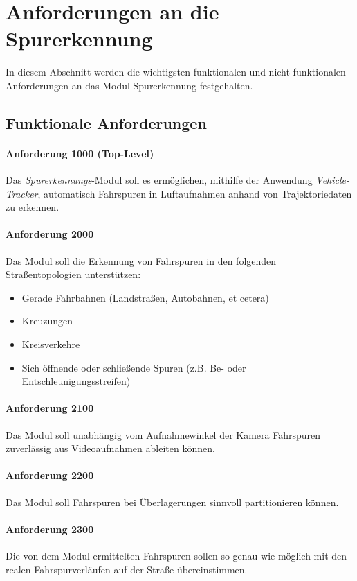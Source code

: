 \section{Anforderungen an die Spurerkennung}
\label{sec:requirements}

In diesem Abschnitt werden die wichtigsten funktionalen und nicht funktionalen Anforderungen
an das Modul Spurerkennung festgehalten.

\subsection{Funktionale Anforderungen}

\paragraph{Anforderung 1000 (Top-Level)}
Das \textit{Spurerkennungs}-Modul soll es ermöglichen, mithilfe der Anwendung \textit{Vehicle-Tracker},
automatisch Fahrspuren in Luftaufnahmen anhand von Trajektoriedaten zu erkennen.

\paragraph{Anforderung 2000}
Das Modul soll die Erkennung von Fahrspuren in den folgenden Straßentopologien unterstützen:

\begin{itemize}
    \item Gerade Fahrbahnen (Landstraßen, Autobahnen, et cetera)
    \item Kreuzungen
    \item Kreisverkehre
    \item Sich öffnende oder schließende Spuren (z.B. Be- oder Entschleunigungsstreifen)
\end{itemize}

\paragraph{Anforderung 2100}
Das Modul soll unabhängig vom Aufnahmewinkel der Kamera Fahrspuren zuverlässig aus Videoaufnahmen ableiten können.

\paragraph{Anforderung 2200}
Das Modul soll Fahrspuren bei Überlagerungen sinnvoll partitionieren können.

\paragraph{Anforderung 2300}
Die von dem Modul ermittelten Fahrspuren sollen so genau wie möglich mit den realen Fahrspurverläufen auf der Straße übereinstimmen.

